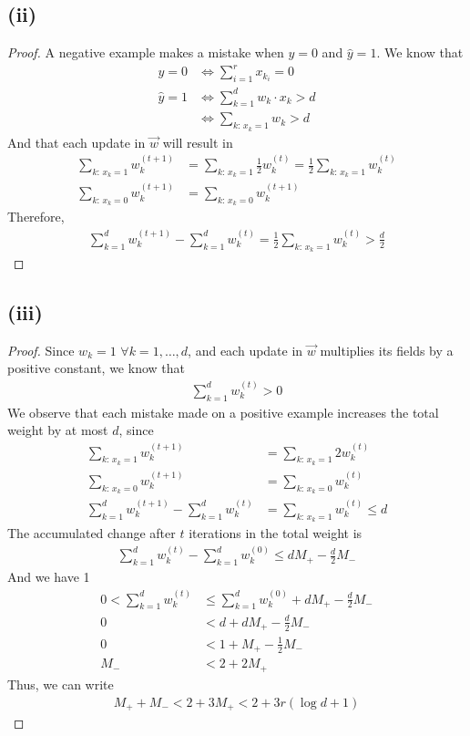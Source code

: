 \documentclass[twoside,11pt]{homework}
\begin{document}
\subsection*{(ii)}
	\begin{proof}
		A negative example makes a mistake when $y=0$ and $\hat{y}=1$. We know that
		\begin{align*}
			y=0 &\Longleftrightarrow \sum_{i=1}^{r}x_{k_i} = 0 \\
			\hat{y}=1 &\Longleftrightarrow \sum_{k=1}^{d} w_k \cdot x_{k} > d \\
			&\Longleftrightarrow \sum_{k: \,x_k=1} w_k  > d
		\end{align*}
		And that each update in $\vec{w}$ will result in
		\begin{align*}
			\sum_{k: \,x_k=1} w_k^{(t+1)}  &= \sum_{k: \,x_k=1} \frac{1}{2}w_k^{(t)}
			= \frac{1}{2} \sum_{k: \,x_k=1} w_k^{(t)}  \\
			\sum_{k: \,x_k=0} w_k^{(t+1)}& = \sum_{k: \,x_k=0} w_k^{(t+1)}
		\end{align*}
		Therefore,
		\begin{align*}
			\sum_{k=1}^d w_k^{(t+1)}-\sum_{k=1}^d w_k^{(t)}
			= \frac{1}{2} \sum_{k: \,x_k=1} w_k^{(t)}
			> \frac{d}{2}
		\end{align*}
	\end{proof}

\subsection*{(iii)}
	\begin{proof}
		Since $w_k = 1$ $\forall k = 1,\dots, d$, and each update in $\vec{w}$ multiplies its fields by a positive constant,
		we know that
		\begin{align*}
			\sum_{k=1}^d w_k ^{(t)} > 0
		\end{align*}
		We observe that each mistake made on a positive example increases the total weight by at most $d$, since
		\begin{align*}
			\sum_{k: \,x_k=1} w_k^{(t+1)}  &= \sum_{k: \,x_k=1} 2w_k^{(t)} \\
			\sum_{k: \,x_k=0} w_k^{(t+1)}  &= \sum_{k: \,x_k=0} w_k^{(t)} \\
			\sum_{k=1}^d w_k^{(t+1)}-\sum_{k=1}^d w_k^{(t)} &=   \sum_{k: \,x_k=1} w_k^{(t)} \leq d
		\end{align*}
		The accumulated change after $t$ iterations in the total weight is
		\begin{align*}
			\sum_{k=1}^d w_k ^{(t)} -\sum_{k=1}^d w_k ^{(0)} \leq d M_+ -\frac{d}{2} M_-
		\end{align*}
		And we have 1
		\begin{align*}
			0<\sum_{k=1}^d w_k ^{(t)} &\leq  \sum_{k=1}^d w_k ^{(0)}  +d M_+ -\frac{d}{2} M_- \\
			0&<d+ d M_+ -\frac{d}{2} M_-\\
			0&<1+  M_+ -\frac{1}{2} M_-\\
			M_- &<2+  2M_+
		\end{align*}
		Thus, we can write
		\begin{align*}
			M_+ + M_-  < 2+ 3M_+< 2+3r(\log{d}+1)
		\end{align*}
	\end{proof}
\end{document}
